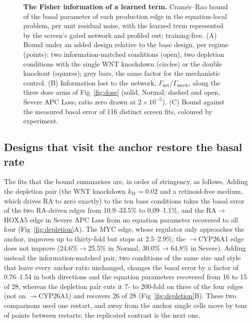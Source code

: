 \begin{figure}[tbp]
\centering
{}
\caption{\textbf{The Fisher information of a learned term.} Cram\'er--Rao bound
of the basal parameter of each production edge in the equation-local problem,
per unit residual noise, with the learned term represented by the screen's
gated network and profiled out; training-free. (A) Bound under an added design
relative to the base design, per regime (points): two information-matched
conditions (open), two depletion conditions with the single WNT knockdown
(circles) or the \bcat{} double knockout (squares); grey bars, the same factor
for the mechanistic control. (B) Information lost to the network,
$\Gamma_{\text{net}}/\Gamma_{\text{mech}}$, along the three dose arms of
Fig~\ref{fig:dose} (solid, Normal; dashed and open, Severe APC Loss; ratio zero
drawn at $2\times10^{-5}$). (C) Bound against the measured basal error of 116
distinct screen fits, coloured by experiment.}
\label{fig:hfim}
\end{figure}

\subsection{Designs that visit the anchor restore the basal rate}
\label{sec:res-dose}

The fits that the bound summarises are, in order of stringency, as follows.
Adding the depletion pair (the WNT knockdown $k_W=0.02$ and a retinoid-free
medium, which drives RA to zero exactly) to the ten base conditions takes the
basal error of the two RA-driven edges from 10.9--33.5\% to 0.09--1.1\%, and
the RA$\to$HOXA5 edge in Severe APC Loss from no equation parameter recovered
to all four (Fig~\ref{fig:depletion}A). The MYC edge, whose regulator only
approaches the anchor, improves up to thirty-fold but stops at 2.5--2.9\%; the
\bcat{}$\to$CYP26A1 edge does not improve (24.6\%$\to$25.5\% in Normal,
30.0\%$\to$64.8\% in Severe). Adding instead the information-matched pair, two
conditions of the same size and style that leave every anchor ratio unchanged,
changes the basal error by a factor of 0.76--1.54 in both directions and the
equation parameters recovered from 16 to 15 of 28, whereas the depletion pair
cuts it 7- to 200-fold on three of the four edges (not on
\bcat{}$\to$CYP26A1) and recovers 26 of 28 (Fig~\ref{fig:depletion}B). These
two comparisons used one restart, and away from the anchor single cells move by
tens of points between restarts; the replicated contrast is the next one.

